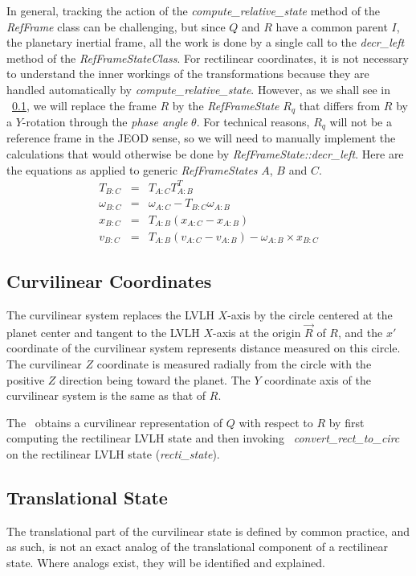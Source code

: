 In general, tracking the action of the \textit{compute\_relative\_state}
method of the \textit{RefFrame} class can be challenging, but since $Q$ and
$R$ have a common parent $I$, the planetary inertial frame, all the work is
done by a single call to the \textit{decr\_left} method of the
\textit{RefFrameStateClass}. For rectilinear coordinates, it is not necessary
to understand the inner workings of the transformations because they are
handled automatically by \textit{compute\_relative\_state}. However, as we
shall see in ~\ref{subsec:curvi_coords},
we will replace the frame $R$ by the \textit{RefFrameState} $R_q$ that differs
from $R$ by a $Y$-rotation through the \emph{phase angle} $\theta$. For technical
reasons, $R_q$ will not be a reference frame in the JEOD sense, so we will
need to manually implement the calculations that would otherwise be done by
\textit{RefFrameState::decr\_left}. Here are the equations as applied to
generic \textit{RefFrameStates} $A$, $B$ and $C$.
\begin{eqnarray}
T_{B:C} & = & T_{A:C}T_{A:B}^T \\ \nonumber
\omega_{B:C} & = & \omega_{A:C} - T_{B:C}\omega_{A:B} \\ \nonumber
x_{B:C} & = & T_{A:B}(x_{A:C} - x_{A:B}) \\ \nonumber
v_{B:C} & = & T_{A:B}(v_{A:C} - v_{A:B}) - \omega_{A:B} \times x_{B:C}
\label{eq:decr_left}
\end{eqnarray}

\subsection{Curvilinear Coordinates}
\label{subsec:curvi_coords}
The curvilinear system replaces the LVLH $X$-axis by the circle centered at the
planet center and tangent to the LVLH $X$-axis at the origin $\vec R$ of $R$,
and the $x'$ coordinate of the curvilinear system represents distance
measured on this circle.  The curvilinear $Z$ coordinate is measured radially
from the circle with the positive $Z$ direction being toward the planet.
The $Y$ coordinate axis of the curvilinear system is the same as that of $R$.

The \LRDSDesc\ obtains a curvilinear representation of
$Q$ with respect to $R$ by first computing the rectilinear LVLH state and then
invoking \textit{~convert\_rect\_to\_circ} on the rectilinear LVLH state
(\textit{recti\_state}).

\subsection{Translational State}
\label{subseq:trans}
The translational part of the curvilinear state is defined by common practice,
and as such, is not an exact analog of the translational component
of a rectilinear state. Where analogs exist, they will be identified and
explained.

